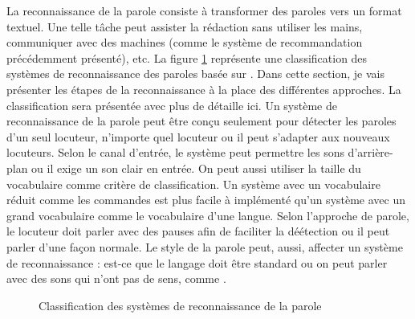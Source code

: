 \documentclass{KodeBook}
\begin{document}
La reconnaissance de la parole consiste à transformer des paroles vers un format textuel. 
Une telle tâche peut assister la rédaction sans utiliser les mains, communiquer avec des machines (comme le système de recommandation précédemment présenté), etc. 
La figure \ref{fig:asr-classif} représente une classification des systèmes de reconnaissance des paroles basée sur \cite{2020-malik-al}.
Dans cette section, je vais présenter les étapes de la  reconnaissance à la place des différentes approches. 
La classification sera présentée avec plus de détaille ici.
Un système de reconnaissance de la parole peut être conçu seulement pour détecter les paroles d'un seul locuteur, n'importe quel locuteur ou il peut s'adapter aux nouveaux locuteurs.
Selon le canal d'entrée, le système peut permettre les sons d'arrière-plan ou il exige un son clair en entrée.  
On peut aussi utiliser la taille du vocabulaire comme critère de classification.
Un système avec un vocabulaire réduit comme les commandes est plus facile à implémenté qu'un système avec un grand vocabulaire comme le vocabulaire d'une langue.
Selon l'approche de parole, le locuteur doit parler avec des pauses afin de faciliter la déétection ou il peut parler d'une façon normale.
Le style de la parole peut, aussi, affecter un système de reconnaissance : est-ce que le langage doit être standard ou on peut parler avec des sons qui n'ont pas de sens, comme .

\begin{figure}[!ht]
	\centering
	\caption{Classification des systèmes de reconnaissance de la parole}
	\label{fig:asr-classif}
\end{figure}

%
\end{document}
